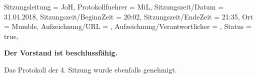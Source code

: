 
\begin{Protokoll}{
        Sitzungsleitung                 = {JoH},             %
        Protokollfuehrer                = {MiL},              %
        Sitzungszeit/Datum              = {31.01.2018},       %
        Sitzungszeit/BeginnZeit         = {20:02},            %
        Sitzungszeit/EndeZeit           = {21:35},            %
        Ort                             = {Mumble},            %
        Aufzeichnung/URL                = {},                %
        Aufzeichnung/Verantwortlicher   = {},                  %
        Status                          = {true},            %
    }
    
    \begin{Anwesenheitsliste}
    \end{Anwesenheitsliste}
    
    \textbf{Der Vorstand ist beschlussfähig.}
    
    Das Protokoll der 4. Sitzung wurde ebenfalls genehmigt.
    

\end{Protokoll}
